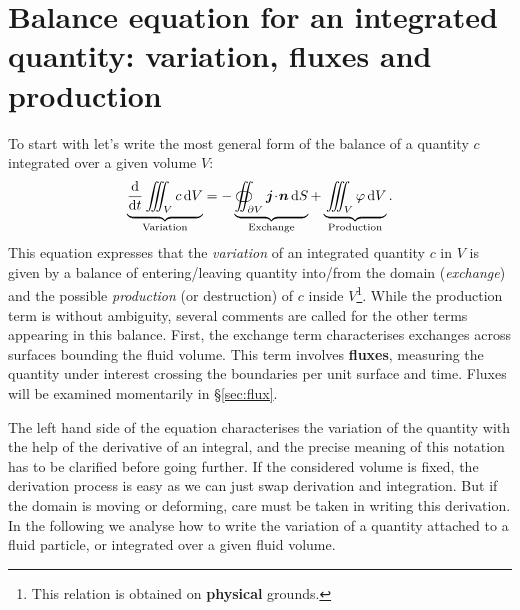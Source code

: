 \section{Balance equation for an integrated quantity: variation, fluxes and production}
To start with let's write the most general form of the balance of a quantity $c$ integrated over a given volume $V$:
\begin{equation}
\underbrace{\vphantom{\oiint_{\partial V}}\dd{}{t}\iiint_{V}c\, \dV}_\text{Variation} = -\underbrace{\oiint_{\partial V} \bj\!\cdot\!\bn\,\dS}_\text{Exchange} + \underbrace{\vphantom{\oiint_{\partial V}}\iiint_{V} \varphi\,\dV}_\text{Production}.
\label{eq:conservation_law}
\end{equation}
This equation expresses that the \textit{variation} of an integrated quantity $c$ in $V$ is given by a balance of entering/leaving quantity into/from the domain (\textit{exchange}) and the possible \textit{production} (or destruction) of $c$ inside $V$\footnote{This relation is obtained on \textbf{physical} grounds.}.
While the production term is without ambiguity, several comments are called for the other terms appearing in this balance. First, the exchange term characterises exchanges across surfaces bounding the fluid volume. This term involves \textbf{fluxes}, measuring the quantity under interest crossing the boundaries per unit surface and time. Fluxes will be examined momentarily in \S\ref{sec:flux}.

The left hand side of the equation characterises the variation of the quantity with the help of the derivative of an integral, and the precise meaning of this notation has to be clarified before going further. If the considered volume is fixed, the derivation process is easy as we can just swap derivation and integration. But if the domain is moving or deforming, care must be taken in writing this derivation. In the following we analyse how to write the variation of a quantity attached to a fluid particle, or integrated over a given fluid volume.

